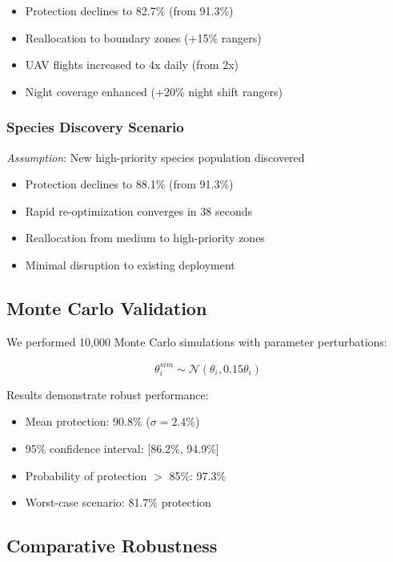\begin{itemize}
    \item Protection declines to 82.7\% (from 91.3\%)
    \item Reallocation to boundary zones (+15\% rangers)
    \item UAV flights increased to 4x daily (from 2x)
    \item Night coverage enhanced (+20\% night shift rangers)
\end{itemize}

\subsubsection{Species Discovery Scenario}
\textit{Assumption}: New high-priority species population discovered

\begin{itemize}
    \item Protection declines to 88.1\% (from 91.3\%)
    \item Rapid re-optimization converges in 38 seconds
    \item Reallocation from medium to high-priority zones
    \item Minimal disruption to existing deployment
\end{itemize}

\subsection{Monte Carlo Validation}

We performed 10,000 Monte Carlo simulations with parameter perturbations:

\begin{equation}
\theta_i^{sim} \sim \mathcal{N}(\theta_i, 0.15\theta_i)
\label{eq:monte_carlo}
\end{equation}

Results demonstrate robust performance:
\begin{itemize}
    \item Mean protection: 90.8\% ($\sigma = 2.4\%$)
    \item 95\% confidence interval: [86.2\%, 94.9\%]
    \item Probability of protection $>$ 85\%: 97.3\%
    \item Worst-case scenario: 81.7\% protection
\end{itemize}

\subsection{Comparative Robustness}

